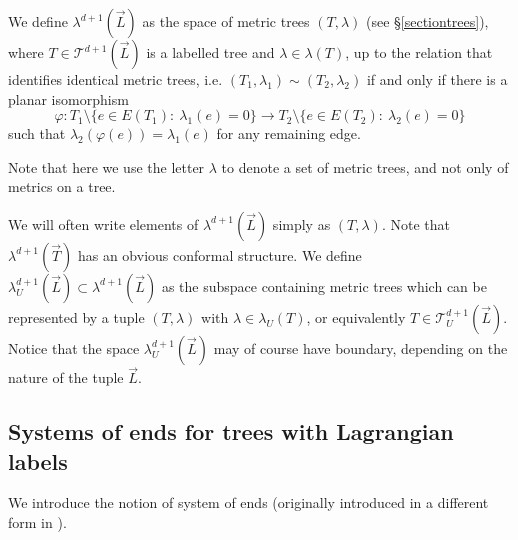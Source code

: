 \begin{dfn}
	We define $\lambda^{d+1}(\vec{L})$ as the space of metric trees $(T,\lambda)$ (see \S \ref{sectiontrees}), where $T\in \mathcal{T}^{d+1}(\vec{L})$ is a labelled tree and $\lambda \in \lambda(T)$, up to the relation that identifies identical metric trees, i.e. $(T_1,\lambda_1)\sim (T_2,\lambda_2)$ if and only if there is a planar isomorphism $$\varphi: T_1\setminus \{e\in E(T_1): \ \lambda_1(e)=0\}\to T_2\setminus\{e\in E(T_2): \ \lambda_2(e)=0\}$$ such that $\lambda_2(\varphi(e))=\lambda_1(e)$ for any remaining edge. 
\end{dfn}
\begin{rem}
	Note that here we use the letter $\lambda$ to denote a set of metric trees, and not only of metrics on a tree.
\end{rem}
\noindent We will often write elements of $\lambda^{d+1}(\vec{L})$ simply as $(T,\lambda)$. Note that $\lambda^{d+1}(\vec{T})$ has an obvious conformal structure. We define $\lambda_U^{d+1}(\vec{L})\subset \lambda^{d+1}(\vec{L})$ as the subspace containing metric trees which can be represented by a tuple $(T,\lambda)$ with $\lambda\in \lambda_U(T)$, or equivalently $T\in \mathcal{T}_U^{d+1}(\vec{L})$. Notice that the space $\lambda_U^{d+1}(\vec{L})$ may of course have boundary, depending on the nature of the tuple $\vec{L}$.\\



\subsection{Systems of ends for trees with Lagrangian labels}\label{seconsystemofends} We introduce the notion of system of ends (originally introduced in a different form in \cite{Charest2012SourceComplexes})\label{sistemofends}. 

